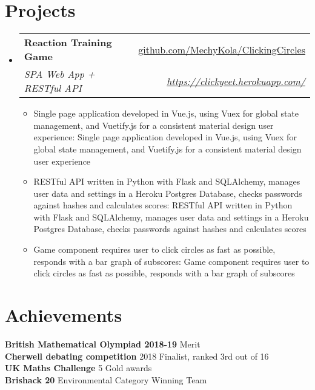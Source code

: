 \documentclass[a4paper,11pt]{article}
\makeatletter
\def \ifempty#1{\def\temp{#1} \ifx\temp\empty }
\newcommand{\resumeItem}[2]{
  \item\small{
  	\ifempty{#1}#2\else\textbf{#1}{: #2 \vspace{-2pt}}\fi
  }
}
\newcommand{\resumeSubheading}[4]{
  \vspace{-1pt}\item
    \begin{tabular*}{0.97\textwidth}{l@{\extracolsep{\fill}}r}
      \textbf{#1} & #2 \\
      \textit{\small#3} & \textit{\small #4} \\
    \end{tabular*}\vspace{-5pt}
}
\newcommand{\resumeSubHeadingListStart}{\begin{itemize}[leftmargin=*]}
\newcommand{\resumeSubHeadingListEnd}{\end{itemize}}
\newcommand{\resumeItemListStart}{\begin{itemize}}
\newcommand{\resumeItemListEnd}{\end{itemize}\vspace{-5pt}}
\makeatother
\begin{document}
\section{Projects}
  \resumeSubHeadingListStart
    \resumeSubheading
      {Reaction Training Game}{\href{https://github.com/MechyKola/ClickingCircles}
      {github.com/MechyKola/ClickingCircles}}
      {SPA Web App + RESTful API}{\href{https://clickyeet.herokuapp.com/}
      {https://clickyeet.herokuapp.com/}}
      \resumeItemListStart
        \resumeItem{}
          {Single page application developed in Vue.js, using Vuex for global state management,
          and Vuetify.js for a consistent material design
          user experience}
        \resumeItem{}
          {RESTful API written in Python with Flask and SQLAlchemy, manages user data and 
          settings in a Heroku Postgres Database, checks passwords against 
          hashes and calculates scores}
        \resumeItem{}
          {Game component requires user to click circles as fast as possible, responds with
          a bar graph of subscores}
      \resumeItemListEnd
  \resumeSubHeadingListEnd


\section{Achievements}
  \textbf{British Mathematical Olympiad 2018-19}{ Merit} \\
  \textbf{Cherwell debating competition}{ 2018 Finalist, ranked 3rd out of 16} \\
  \textbf{UK Maths Challenge}{ 5 Gold  awards} \\
  \textbf{Brishack 20}{ Environmental Category Winning Team} \\
  
  
\end{document}
